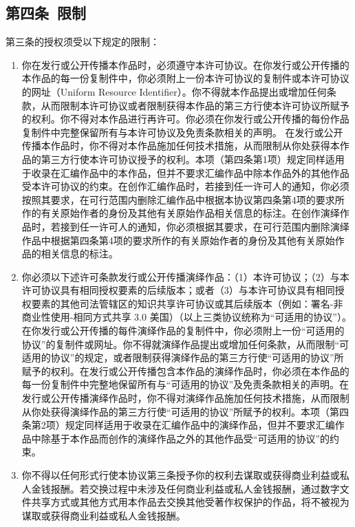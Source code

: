 \subsection{第四条\ 限制}
第三条的授权须受以下规定的限制： 
\begin{enumerate}
	\item 你在发行或公开传播本作品时，必须遵守本许可协议。在你发行或公开传播的本作品的每一份复制件中，你必须附上一份本许可协议的复制件或本许可协议的网址（Uniform Resource Identifier）。你不得就本作品提出或增加任何条款，从而限制本许可协议或者限制获得本作品的第三方行使本许可协议所赋予的权利。你不得对本作品进行再许可。你必须在你发行或公开传播的每份作品复制件中完整保留所有与本许可协议及免责条款相关的声明。 在发行或公开传播本作品时，你不得对本作品施加任何技术措施，从而限制从你处获得本作品的第三方行使本许可协议授予的权利。本项（第四条第1项）规定同样适用于收录在汇编作品中的本作品，但并不要求汇编作品中除本作品外的其他作品受本许可协议的约束。在创作汇编作品时，若接到任一许可人的通知，你必须按照其要求，在可行范围内删除汇编作品中根据本协议第四条第4项的要求所作的有关原始作者的身份及其他有关原始作品相关信息的标注。在创作演绎作品时，若接到任一许可人的通知，你必须根据其要求，在可行范围内删除演绎作品中根据第四条第4项的要求所作的有关原始作者的身份及其他有关原始作品的相关信息的标注。
	\item 你必须以下述许可条款发行或公开传播演绎作品：（1）本许可协议；（2）与本许可协议具有相同授权要素的后续版本；或者（3）与本许可协议具有相同授权要素的其他司法管辖区的知识共享许可协议或其后续版本（例如：署名-非商业性使用-相同方式共享 3.0 美国）（以上三类协议统称为“可适用的协议”）。在你发行或公开传播的每件演绎作品的复制件中，你必须附上一份“可适用的协议”的复制件或网址。你不得就演绎作品提出或增加任何条款，从而限制“可适用的协议”的规定，或者限制获得演绎作品的第三方行使“可适用的协议”所赋予的权利。在发行或公开传播包含本作品的演绎作品时，你必须在本作品的每一份复制件中完整地保留所有与“可适用的协议”及免责条款相关的声明。在发行或公开传播演绎作品时，你不得对演绎作品施加任何技术措施，从而限制从你处获得演绎作品的第三方行使“可适用的协议”所赋予的权利。本项（第四条第2项）规定同样适用于收录在汇编作品中的演绎作品，但并不要求汇编作品中除基于本作品而创作的演绎作品之外的其他作品受“可适用的协议”的约束。 
	\item 你不得以任何形式行使本协议第三条授予你的权利去谋取或获得商业利益或私人金钱报酬。若交换过程中未涉及任何商业利益或私人金钱报酬，通过数字文件共享方式或其他方式用本作品去交换其他受著作权保护的作品，将不被视为谋取或获得商业利益或私人金钱报酬。

\end{enumerate}
